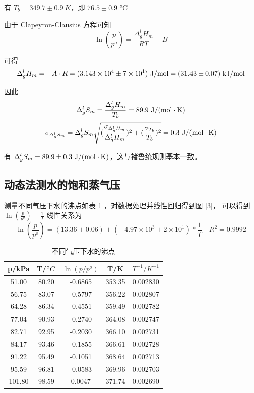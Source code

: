 \documentclass[cn,hazy,pku,12pt,normal,math=newtx,cite=super]{elegantnote}
\begin{document}
有 $T_b = 349.7 \pm 0.9\ K$，即 $76.5 \pm 0.9$ °C

由于 Clapeyron-Clausius 方程可知
$$
\ln(\frac{p}{p^o}) = \frac{\Delta^l_g H_m}{RT} + B
$$

可得
$$
\Delta^l_g H_m = - A \cdot R = (3.143 \times 10^4 \pm 7 \times 10^1) \ {\rm J/mol} = (31.43 \pm 0.07) \ {\rm kJ/mol}
$$

因此
$$
\Delta^l_g S_m = \frac{\Delta^l_g H_m}{T_b} = 89.9\ {\rm J/(mol \cdot K)}
$$
$$
\sigma_{\Delta^l_g S_m} = \Delta^l_g S_m\sqrt{(\frac{\sigma_{\Delta^l_g H_m}}{\Delta^l_g H_m})^2+(\frac{\sigma_{T_b}}{T_b})^2} = 0.3\ {\rm J/(mol \cdot K)}
$$

有 $\Delta^l_g S_m = 89.9 \pm 0.3\  {\rm J/(mol\cdot K)}$，这与褚鲁统规则基本一致。

\subsection{动态法测水的饱和蒸气压}

测量不同气压下水的沸点如表 \ref{03} ，对数据处理并线性回归得到图 \ref{3}，
可以得到 $\ln(\frac{p}{p^o}) - \frac{1}{T}$ 线性关系为
$$
\ln(\frac{p}{p^o}) = (13.36 \pm 0.06) + (-4.97 \times 10^3 \pm 2 \times 10^1) * \frac{1}{T} \quad R^2=0.9992
$$

\begin{table}[h]
    \centering
    \caption{不同气压下水的沸点}
    \label{03}
    \begin{tabular}{ccccc}
    \hline
    p/kPa  & T/$\degree C$ & $\ln(p/p^o)$ & T/K    & $T^{-1}/K^{-1}$ \\ \hline
    51.00  & 80.20         & -0.6865      & 353.35 & 0.002830        \\
    56.75  & 83.07         & -0.5797      & 356.22 & 0.002807        \\
    64.28  & 86.34         & -0.4551      & 359.49 & 0.002782        \\
    77.04  & 90.93         & -0.2740      & 364.08 & 0.002747        \\
    82.71  & 92.95         & -0.2030      & 366.10 & 0.002731        \\
    84.17  & 93.46         & -0.1855      & 366.61 & 0.002728        \\
    91.22  & 95.49         & -0.1051      & 368.64 & 0.002713        \\
    95.59  & 96.81         & -0.0583      & 369.96 & 0.002703        \\
    101.80 & 98.59         & 0.0047       & 371.74 & 0.002690        \\ \hline
    \end{tabular}
\end{table}
\end{document}
